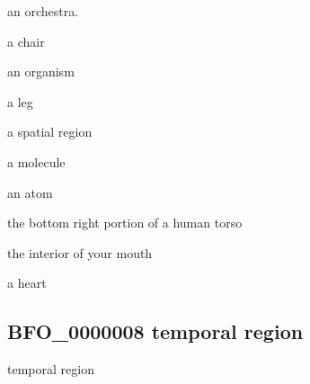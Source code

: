 \documentclass[letterpaper,10pt,english]{sphinxmanual}
\begin{document}
\begin{sphinxShadowBox}

\sphinxAtStartPar
an orchestra.

\sphinxAtStartPar
a chair

\sphinxAtStartPar
an organism

\sphinxAtStartPar
a leg

\sphinxAtStartPar
a spatial region

\sphinxAtStartPar
a molecule

\sphinxAtStartPar
an atom

\sphinxAtStartPar
the bottom right portion of a human torso

\sphinxAtStartPar
the interior of your mouth

\sphinxAtStartPar
a heart
\end{sphinxShadowBox}

\begin{sphinxShadowBox}

\sphinxAtStartPar
{}
\end{sphinxShadowBox}
\begin{quote}

\ignorespaces \end{quote}


\subsection{BFO\_0000008 \sphinxhyphen{} temporal region}
\label{\detokenize{doc-BFO_0000008:bfo-0000008-temporal-region}}\label{\detokenize{doc-BFO_0000008:index-0}}\label{\detokenize{doc-BFO_0000008::doc}}
\begin{sphinxShadowBox}

\sphinxAtStartPar
temporal region
\end{sphinxShadowBox}

\begin{sphinxShadowBox}

\sphinxAtStartPar
{\hyperref[\detokenize{doc-BFO_0000003::doc}]{}}
\end{sphinxShadowBox}
\end{document}
